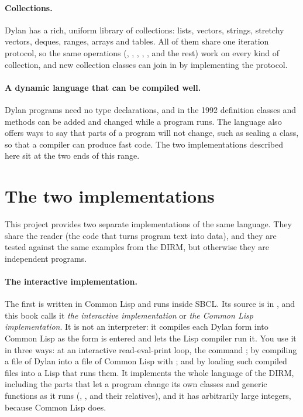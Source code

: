 \paragraph{Collections.} Dylan has a rich, uniform library of collections:
lists, vectors, strings, stretchy vectors, deques, ranges, arrays and
tables. All of them share one iteration protocol, so the same operations
(, , , , ,
 and the rest) work on every kind of collection, and new
collection classes can join in by implementing the protocol.

\paragraph{A dynamic language that can be compiled well.} Dylan programs
need no type declarations, and in the 1992 definition classes and methods
can be added and changed while a program runs. The language also offers
ways to say that parts of a program will not change, such as sealing a
class, so that a compiler can produce fast code. The two implementations
described here sit at the two ends of this range.

\section{The two implementations}\label{sec:intro-implementations}

This project provides two separate implementations of the same language.
They share the reader (the code that turns program text into data), and
they are tested against the same examples from the DIRM, but otherwise
they are independent programs.

\paragraph{The interactive implementation.}
The first is written in Common Lisp and runs inside SBCL. Its source is in
, and this book calls it \emph{the interactive
implementation} or \emph{the Common Lisp implementation}. It is not an
interpreter: it compiles each Dylan form into Common Lisp as the form is
entered and lets the Lisp compiler run it. You use it in three ways: at an
interactive read-eval-print loop, the command ; by
compiling a file of Dylan into a file of Common Lisp with
; and by loading such compiled files into a Lisp
that runs them. It implements the whole language of the DIRM, including
the parts that let a program change its own classes and generic functions
as it runs (, ,  and
their relatives), and it has arbitrarily large integers, because Common
Lisp does.

